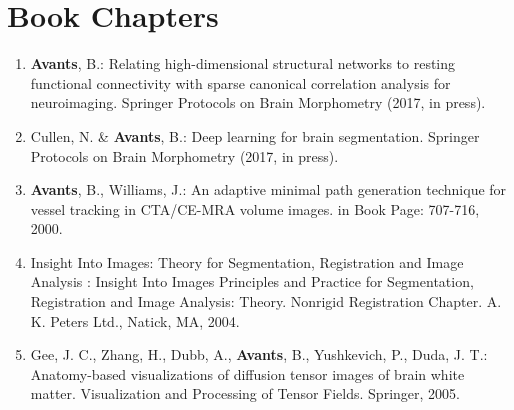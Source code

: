 \documentclass[11pt]{moderncv} %
\begin{document}
\section{Book Chapters}
\begin{enumerate}
\item \textbf{Avants}, B.: Relating high-dimensional structural networks to
resting functional connectivity with sparse canonical correlation analysis
for neuroimaging.  Springer Protocols on Brain Morphometry (2017, in press).
\item Cullen, N. \& \textbf{Avants}, B.: Deep learning for brain segmentation.  Springer Protocols on Brain Morphometry (2017, in press).
\item \textbf{Avants}, B., Williams, J.: An adaptive minimal path generation technique for vessel tracking in CTA/CE-MRA volume images. in Book Page: 707-716, 2000.
\item Insight Into Images: Theory for Segmentation, Registration and Image Analysis :
Insight Into Images Principles and Practice for Segmentation, Registration and Image Analysis: Theory. Nonrigid Registration Chapter. A. K. Peters Ltd., Natick, MA, 2004.
\item Gee, J. C., Zhang, H., Dubb, A., \textbf{Avants}, B., Yushkevich, P., Duda, J. T.: Anatomy-based visualizations of diffusion tensor images of brain white matter. Visualization and Processing of Tensor Fields. Springer, 2005.
\end{enumerate}

\end{document}
